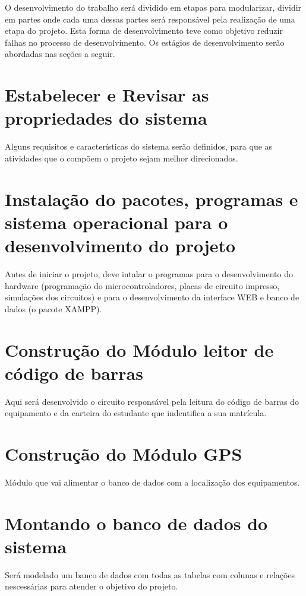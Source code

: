 \vspace{-42pt} 
O desenvolvimento do trabalho será dividido em etapas para modularizar, dividir em partes onde cada uma dessas partes será responsável pela realização de uma etapa do projeto. Esta forma de desenvolvimento teve como objetivo reduzir falhas no processo de desenvolvimento. Os estágios de desenvolvimento serão abordadas nas seções a seguir. 

\section[Estabelecer e Revisar as propriedades do sistema]{Estabelecer e Revisar as propriedades do sistema}
Alguns requisitos e características do sistema serão definidos, para que as atividades que o compõem o projeto sejam melhor direcionados. 

\section[Instalação do pacotes, programas e sistema operacional para o desenvolvimento do projeto]{Instalação do pacotes, programas e sistema operacional para o desenvolvimento do projeto}
Antes de iniciar o projeto, deve intalar o programas para o desenvolvimento do hardware (programação do microcontroladores, placas de circuito impresso, simulações dos circuitos) e para o desenvolvimento da interface WEB e banco de dados (o pacote XAMPP).

\section[Construção do Módulo leitor de código de barras]{Construção do Módulo leitor de código de barras}
Aqui será desenvolvido o circuito responsável pela leitura do código de barras do equipamento e da carteira do estudante que indentifica a sua matrícula. 

\section[Construção do Módulo GPS]{Construção do Módulo GPS}
Módulo que vai alimentar o banco de dados com a localização dos equipamentos. 

\section[Montando o banco de dados do sistema]{Montando o banco de dados do sistema}
Será modelado um banco de dados com todas as tabelas com colunas e relações nescessárias para atender o objetivo do projeto. 

